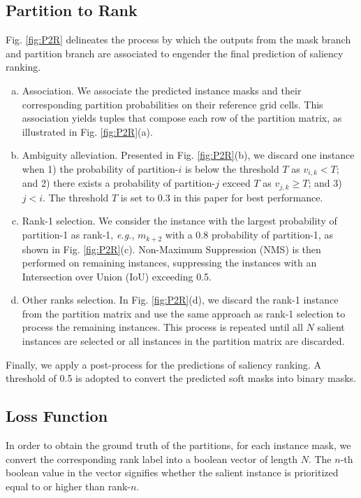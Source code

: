\documentclass[sigconf]{acmart}
\begin{document}
\subsection{Partition to Rank}
Fig. \ref{fig:P2R} delineates the process by which the outputs from the mask branch and partition branch are associated to engender the final prediction of saliency ranking. 
\begin{enumerate}[(a)]
  \item Association. We associate the predicted instance masks and their corresponding partition probabilities on their reference grid cells. This association yields tuples that compose each row of the partition matrix, as illustrated in Fig. \ref{fig:P2R}(a).
  \item Ambiguity alleviation. Presented in Fig. \ref{fig:P2R}(b), we discard one instance when 1) the probability of partition-$i$ is below the threshold $T$ as $v_{i,k}<T$; and 2) there exists a probability of partition-$j$ exceed $T$ as $v_{j, k} \geq T$; and 3)  $j<i$. The threshold $T$ is set to 0.3 in this paper for best performance. 
  \item Rank-1 selection. We consider the instance with the largest probability of partition-1 as rank-1, \textit{e.g.}, $m_{k+2}$ with a 0.8 probability of partition-1, as shown in Fig. \ref{fig:P2R}(c). Non-Maximum Suppression (NMS) is then performed on remaining instances, suppressing the instances with an Intersection over Union (IoU) exceeding 0.5.
  \item Other ranks selection. In Fig. \ref{fig:P2R}(d), we discard the rank-1 instance from the partition matrix and use the same approach as rank-1 selection to process the remaining instances. This process is repeated until all $N$ salient instances are selected or all instances in the partition matrix are discarded.
\end{enumerate}
 Finally, we apply a post-process for the predictions of saliency ranking. A threshold of 0.5 is adopted to convert the predicted soft masks into binary masks.

\subsection{Loss Function}

In order to obtain the ground truth of the partitions, for each instance mask, we convert the corresponding rank label into a boolean vector of length $N$. The $n$-th boolean value in the vector signifies whether the salient instance is prioritized equal to or higher than rank-$n$. 
\end{document}
